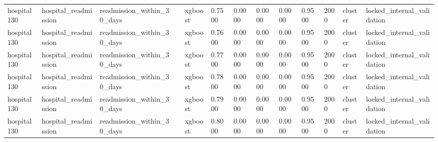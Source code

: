 \begin{tabular}{lllllllllllll}
hospital130 & hospital\_readmission & readmission\_within\_30\_days &  & xgboost & 0.7500 & 0.0000 & 0.0000 & 0.0000 & 0.9500 & 2000 & cluster & locked\_internal\_validation \\
hospital130 & hospital\_readmission & readmission\_within\_30\_days &  & xgboost & 0.7600 & 0.0000 & 0.0000 & 0.0000 & 0.9500 & 2000 & cluster & locked\_internal\_validation \\
hospital130 & hospital\_readmission & readmission\_within\_30\_days &  & xgboost & 0.7700 & 0.0000 & 0.0000 & 0.0000 & 0.9500 & 2000 & cluster & locked\_internal\_validation \\
hospital130 & hospital\_readmission & readmission\_within\_30\_days &  & xgboost & 0.7800 & 0.0000 & 0.0000 & 0.0000 & 0.9500 & 2000 & cluster & locked\_internal\_validation \\
hospital130 & hospital\_readmission & readmission\_within\_30\_days &  & xgboost & 0.7900 & 0.0000 & 0.0000 & 0.0000 & 0.9500 & 2000 & cluster & locked\_internal\_validation \\
hospital130 & hospital\_readmission & readmission\_within\_30\_days &  & xgboost & 0.8000 & 0.0000 & 0.0000 & 0.0000 & 0.9500 & 2000 & cluster & locked\_internal\_validation \\
\hline
\end{tabular}
